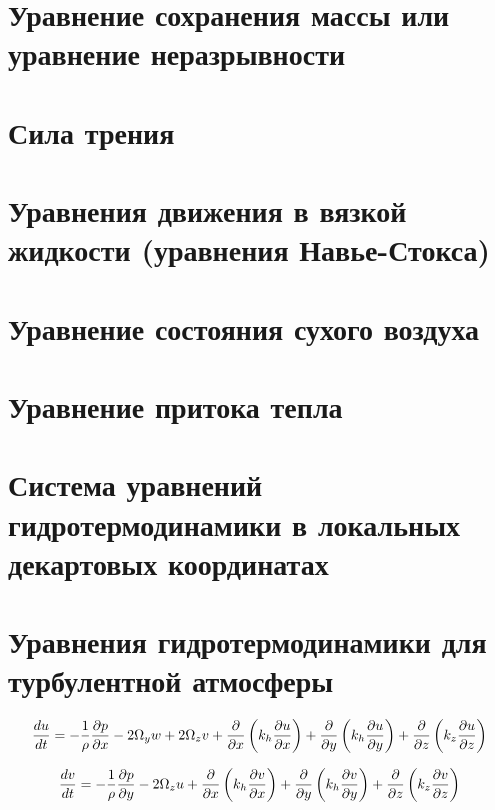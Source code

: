 \section{Уравнение сохранения массы или уравнение неразрывности}

\section{Сила трения}

\section{Уравнения движения в вязкой жидкости (уравнения Навье-Стокса)}

\section{Уравнение состояния сухого воздуха}

\section{Уравнение притока тепла}

\section{Система уравнений гидротермодинамики в локальных декартовых координатах}

\section{Уравнения гидротермодинамики для турбулентной атмосферы} \label{ch:turb_equations}

\begin{equation}
\label{mom_conserv_turb_u}
    \displaystyle\frac{d u}{d t} = -\frac{1}{\rho}\displaystyle\frac{\partial p}{\partial x} - 2\Omega_yw + 2\Omega_zv + 
    \frac{\partial}{\partial x} \left( k_h \displaystyle\frac{\partial u}{\partial x} \right) + 
    \frac{\partial}{\partial y} \left( k_h \displaystyle\frac{\partial u}{\partial y} \right) + 
    \frac{\partial}{\partial z} \left( k_z \displaystyle\frac{\partial u}{\partial z} \right)
\end{equation}

\begin{equation}
\label{mom_conserv_turb_v}
    \displaystyle\frac{d v}{d t} = -\frac{1}{\rho}\displaystyle\frac{\partial p}{\partial y} - 2\Omega_zu +  
    \frac{\partial}{\partial x} \left( k_h \displaystyle\frac{\partial v}{\partial x} \right) + 
    \frac{\partial}{\partial y} \left( k_h \displaystyle\frac{\partial v}{\partial y} \right) + 
    \frac{\partial}{\partial z} \left( k_z \displaystyle\frac{\partial v}{\partial z} \right)
\end{equation}


